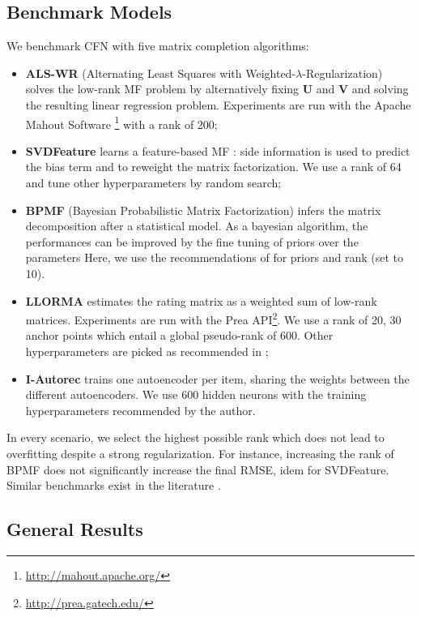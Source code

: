 \documentclass{article}
\newcommand{\mtx}[1]{\ensuremath{\mathbf{#1}}}
\begin{document}
\subsection{Benchmark Models}
We benchmark CFN with five matrix completion algorithms:
\begin{itemize}\item
{\bf ALS-WR} (Alternating Least Squares with Weighted-$\lambda$-Regularization) \cite{Zhou2008} solves the low-rank MF problem by alternatively fixing $\mtx{U}$ and $\mtx{V}$ and solving the resulting linear regression problem. Experiments are run with the Apache Mahout Software \footnote{\url{http://mahout.apache.org/}} with a rank of 200;
 \item {\bf SVDFeature} \cite{Chen2012} learns a feature-based MF : side information is used to predict the bias term and to reweight the matrix factorization. We use a rank of 64 and tune other hyperparameters by random search;
  \item {\bf BPMF} (Bayesian Probabilistic Matrix Factorization)  infers the matrix decomposition after a statistical model. As a bayesian algorithm, the performances can be improved by the fine tuning of priors over the parameters Here, we use the recommendations of \cite{Salakhutdinov2008} for priors and rank (set to 10).\item {\bf LLORMA}  estimates the rating matrix as a weighted sum of low-rank matrices. Experiments are run with the Prea API\footnote{\url{http://prea.gatech.edu/}}. We use a rank of 20, 30 anchor points which entail a global pseudo-rank of 600. Other hyperparameters are picked as recommended in \cite{Lee2013};
 \item {\bf I-Autorec} \cite{Sedhain2015} trains one autoencoder per item, sharing the weights between the different autoencoders. We use 600 hidden neurons with the training hyperparameters recommended by the author.
\end{itemize}
In every scenario, we select the highest possible rank which does not lead to overfitting despite a strong regularization. For instance, increasing the rank of BPMF does not significantly increase the final RMSE, idem for SVDFeature. Similar benchmarks exist in the literature \cite{Lee2013,Li2016,Zheng2016}.


\subsection{General Results} 
\end{document}
